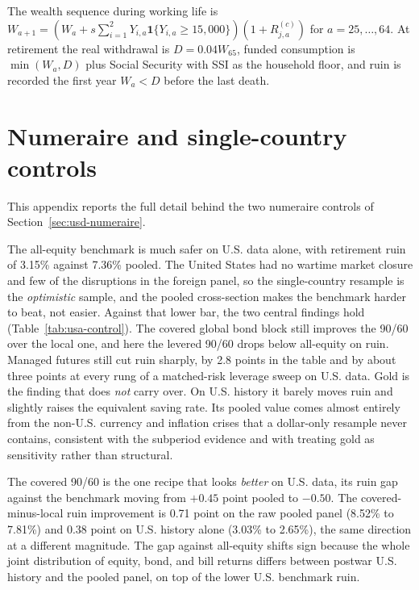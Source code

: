 \documentclass[11pt]{article}
\begin{document}
The wealth sequence during working life is
$W_{a+1}=(W_a+s\sum_{i=1}^{2}Y_{i,a}\mathbf{1}\{Y_{i,a}\geq15{,}000\})
(1+R^{(c)}_{j,a})$ for $a=25,\ldots,64$. At retirement the real withdrawal is
$D=0.04W_{65}$, funded consumption is $\min(W_a,D)$ plus Social Security with
SSI as the household floor, and ruin is recorded the first year $W_a<D$ before
the last death.

\section{Numeraire and single-country controls}
\label{app:numeraire-controls}

This appendix reports the full detail behind the two numeraire controls of Section~\ref{sec:usd-numeraire}.

The all-equity benchmark is much safer on U.S. data alone, with retirement ruin
of 3.15\% against 7.36\% pooled. The United States had no wartime market closure
and few of the disruptions in the foreign panel, so the single-country resample
is the \emph{optimistic} sample, and the pooled cross-section makes the
benchmark harder to beat, not easier. Against that lower bar, the two central
findings hold (Table~\ref{tab:usa-control}). The covered global bond block still
improves the 90/60 over the local one, and here the levered 90/60 drops below
all-equity on ruin. Managed futures still cut ruin sharply, by 2.8 points in the
table and by about three points at every rung of a matched-risk leverage sweep
on U.S. data. Gold is the finding that does \emph{not} carry over. On U.S.
history it barely moves ruin and slightly raises the equivalent saving rate. Its
pooled value comes almost entirely from the non-U.S. currency and inflation
crises that a dollar-only resample never contains, consistent with the subperiod
evidence and with treating gold as sensitivity rather than structural.

The covered 90/60 is the one recipe that looks \emph{better} on U.S. data, its
ruin gap against the benchmark moving from $+0.45$ point pooled to $-0.50$. The
covered-minus-local ruin improvement is 0.71 point on the raw pooled panel
(8.52\% to 7.81\%) and 0.38 point on U.S. history alone (3.03\% to
2.65\%), the same direction at a different magnitude. The gap against
all-equity shifts sign because the whole joint distribution of equity, bond,
and bill returns differs between postwar U.S. history and the pooled panel, on
top of the lower U.S. benchmark ruin.
\end{document}
